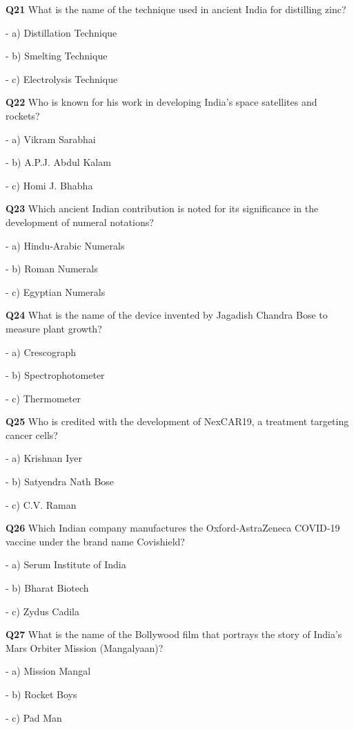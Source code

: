 \textbf{Q21} What is the name of the technique used in ancient India for distilling zinc?\par
\quad - a) Distillation Technique\par
\quad - b) Smelting Technique\par
\quad - c) Electrolysis Technique\par

\textbf{Q22} Who is known for his work in developing India's space satellites and rockets?\par
\quad - a) Vikram Sarabhai\par
\quad - b) A.P.J. Abdul Kalam\par
\quad - c) Homi J. Bhabha\par

\textbf{Q23} Which ancient Indian contribution is noted for its significance in the development of numeral notations?\par
\quad - a) Hindu‑Arabic Numerals\par
\quad - b) Roman Numerals\par
\quad - c) Egyptian Numerals\par

\textbf{Q24} What is the name of the device invented by Jagadish Chandra Bose to measure plant growth?\par
\quad - a) Crescograph\par
\quad - b) Spectrophotometer\par
\quad - c) Thermometer\par

\textbf{Q25} Who is credited with the development of NexCAR19, a treatment targeting cancer cells?\par
\quad - a) Krishnan Iyer\par
\quad - b) Satyendra Nath Bose\par
\quad - c) C.V. Raman\par

\textbf{Q26} Which Indian company manufactures the Oxford‑AstraZeneca COVID‑19 vaccine under the brand name Covishield?\par
\quad - a) Serum Institute of India\par
\quad - b) Bharat Biotech\par
\quad - c) Zydus Cadila\par

\textbf{Q27} What is the name of the Bollywood film that portrays the story of India's Mars Orbiter Mission (Mangalyaan)?\par
\quad - a) Mission Mangal\par
\quad - b) Rocket Boys\par
\quad - c) Pad Man\par

